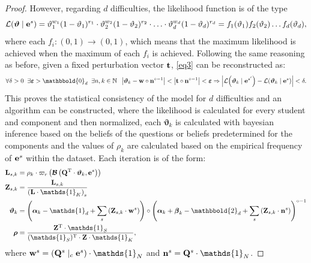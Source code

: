 \documentclass{article}
\newcommand{\0}{\mathbbold{0}}
\newcommand{\1}{\mathds{1}}
\newcommand{\2}{\mathbbold{2}}
\newcommand{\T}{^{\operatorname{T}}}
\newcommand{\Lh}[2]{\mathcal{L}\!\left(#1 \mid #2\right)}
\begin{document}
\begin{proof}
    However, regarding $d$ difficulties, the likelihood function is of the type
    $$ \Lh{\boldsymbol \vartheta}{{\bf e}^s} = \vartheta_1^{w_1}(1-\vartheta_1)^{r_1} \cdot \vartheta_2^{w_2}(1-\vartheta_2)^{r_2} \cdot \hdots \cdot \vartheta_d^{w_d}(1-\vartheta_d)^{r_d} = f_1(\vartheta_1)f_2(\vartheta_2)\dots f_d(\vartheta_d), $$
    where each $f_i\colon (0,1) \longrightarrow (0,1)$, which means that the maximum likelihood is achieved when the maximum of each $f_i$ is achieved.
    Following the same reasoning as before, given a fixed perturbation vector ${\bf t}$, \eqref{eq3} can be reconstructed as:
    \begin{equation}
        \forall \delta > 0 \;\; \exists \boldsymbol{\varepsilon} > \0_d \;\; \exists n,k \in \mathbb{N} \;\; \left| \boldsymbol{\vartheta}_k - {\bf w} \circ {\bf n}^{\circ-1} \right| < \left| {\bf t} \circ {\bf n}^{\circ-1} \right| < \boldsymbol{\varepsilon} \Rightarrow \left| \Lh{\boldsymbol{\vartheta}_k}{{\bf e}^{s'}} - \Lh{\boldsymbol{\vartheta}_k}{{\bf e}^{s}} \right| < \delta. \label{eq4}
    \end{equation}
    This proves the statistical consistency of the model for $d$ difficulties and an algorithm can be constructed, where the likelihood is calculated for every student and component and then normalized, each $\boldsymbol{\vartheta}_k$ is calculated with bayesian inference based on the beliefs of the questions or beliefs predetermined for the components and the values of $\rho_k$ are calculated based on the empirical frequency of ${\bf e}^s$ within the dataset.
    Each iteration is of the form:
    \begin{align}\begin{split}\label{alg1}
        {\bf L}_{s,k} &= \rho_k \cdot \varpi_r\left(\boldsymbol{\mathcal{B}}\left({\bf Q}\T \cdot \boldsymbol{\vartheta}_k, {\bf e}^s\right)\right) \\
        {\bf Z}_{s,k} &= \frac{{\bf L}_{s,k}}{\left({\bf L} \cdot \1_K\right)_s} \\
        \boldsymbol{\vartheta}_k &= \left( \boldsymbol{\alpha}_k - \1_d + \sum_s \left({\bf Z}_{s,k} \cdot {\bf w}^s\right) \right) \circ \left( \boldsymbol{\alpha}_k + \boldsymbol{\beta}_k - \2_d + \sum_s\left({\bf Z}_{s,k} \cdot {\bf n}^s\right) \right)^{\circ-1} \\
        \boldsymbol{\rho} &= \frac{{\bf Z}\T \cdot \1_S}{(\1_S)\T \cdot {\bf Z} \cdot \1_K},
    \end{split}\end{align}
    where ${\bf w}^s = \left({\bf Q}^s \mid_c {\bf e}^s \right) \cdot \1_N$ and ${\bf n}^s = {\bf Q}^s \cdot \1_N$.
\end{proof}
\end{document}
